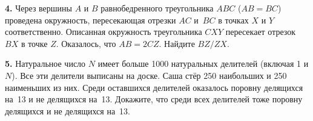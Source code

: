 \documentclass[12pt]{article}
\def\q#1.{{\bf #1. }}
\begin{document}
\q4. Через вершины $A$ и $B$ равнобедренного треугольника $ABC$ ($AB=BC$) проведена окружность, пересекающая отрезки $AC$ и~$BC$ в точках $X$ и $Y$ соответственно. Описанная окружность треугольника $CXY$ пересекает отрезок $BX$ в точке $Z$. Оказалось, что $AB=2CZ$. Найдите $BZ/ZX$.

\q5. Натуральное число $N$ имеет больше 1000 натуральных делителей (включая 1 и $N$). Все эти делители выписаны на доске. Саша стёр 250 наибольших и 250 наименьших из них. Среди оставшихся делителей оказалось поровну делящихся на~13 и не делящихся на~13. Докажите, что среди всех делителей тоже поровну делящихся и не делящихся на~13.
\end{document}
